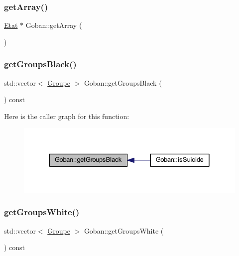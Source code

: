 \subsubsection{\texorpdfstring{get\+Array()}{getArray()}}
{\footnotesize\ttfamily \hyperlink{class_etat}{Etat} $\ast$ Goban\+::get\+Array (\begin{DoxyParamCaption}{ }\end{DoxyParamCaption})}

\mbox{\label{class_goban_a0a8ed1098b25c0c42cb5faadaa0605d4}} 
\subsubsection{\texorpdfstring{get\+Groups\+Black()}{getGroupsBlack()}}
{\footnotesize\ttfamily std\+::vector$<$ \hyperlink{class_groupe}{Groupe} $>$ Goban\+::get\+Groups\+Black (\begin{DoxyParamCaption}{ }\end{DoxyParamCaption}) const}

Here is the caller graph for this function\+:
\nopagebreak
\begin{figure}[H]
\begin{center}
\leavevmode
\includegraphics[width=328pt]{class_goban_a0a8ed1098b25c0c42cb5faadaa0605d4_icgraph}
\end{center}
\end{figure}
\mbox{\label{class_goban_a0d5ecea357ff85e7d08f2c0855d83e6b}} 
\subsubsection{\texorpdfstring{get\+Groups\+White()}{getGroupsWhite()}}
{\footnotesize\ttfamily std\+::vector$<$ \hyperlink{class_groupe}{Groupe} $>$ Goban\+::get\+Groups\+White (\begin{DoxyParamCaption}{ }\end{DoxyParamCaption}) const}

